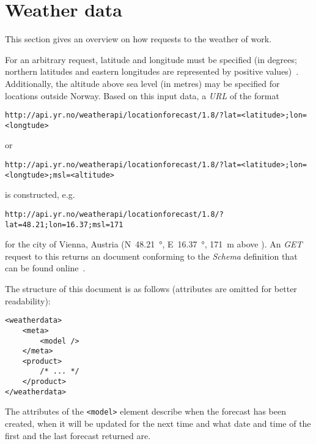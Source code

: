 \section{Weather data}
\label{sec:weather_data_yr_no}

This section gives an overview on how requests to the weather  of \yrno work.

For an arbitrary request, latitude and longitude must be specified (in degrees; northern latitudes and eastern longitudes are represented by positive values)~\cite{yrno_documentation}. Additionally, the altitude above sea level (in metres) may be specified for locations outside Norway. Based on this input data, a \emph{URL} of the format

\begin{lstlisting}
http://api.yr.no/weatherapi/locationforecast/1.8/?lat=<latitude>;lon=<longtude>
\end{lstlisting}

or

\begin{lstlisting}
http://api.yr.no/weatherapi/locationforecast/1.8/?lat=<latitude>;lon=<longtude>;msl=<altitude>
\end{lstlisting}

is constructed, e.g.

\begin{lstlisting}
http://api.yr.no/weatherapi/locationforecast/1.8/?lat=48.21;lon=16.37;msl=171
\end{lstlisting}

for the city of Vienna, Austria (N~\SI {48.21}{\degree }, E~\SI {16.37}{\degree }, \SI {171}{\metre } above ). An  \emph{GET} request to this  returns an  document conforming to the  \emph{Schema}\cite{xml-schema} definition that can be found online~\cite{yrno_schema}.

The structure of this  document is as follows (attributes are omitted for better readability):

\begin{lstlisting}
<weatherdata>
	<meta>
		<model />
	</meta>
	<product>
		/* ... */
	</product>
</weatherdata>
\end{lstlisting}

The attributes of the \texttt{<model>} element describe when the forecast has been created, when it will be updated for the next time and what date and time of the first and the last forecast returned are.

